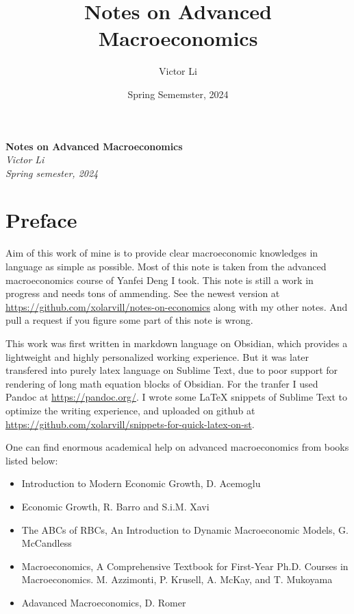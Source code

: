 \documentclass{article}
\title{Notes on Advanced Macroeconomics}
\author{Victor Li}
\date{Spring Sememster, 2024}
\providecommand{\tightlist}{
  \setlength{\itemsep}{0pt}
  \setlength{\parskip}{0pt}}
\begin{document}
\begin{titlepage}
   \begin{center}
      \Large\textbf{Notes on Advanced Macroeconomics}\\
      \large\textit{Victor Li}\\
      \large\textit{Spring semester, 2024}
   \end{center}
\end{titlepage}

\newpage
\tableofcontents

\newpage
{}
\section*{Preface}

Aim of this work of mine is to provide clear macroeconomic knowledges in language as simple as possible. Most of this note is taken from the advanced macroeconomics course of Yanfei Deng I took. This note is still a work in progress and needs tons of ammending. See the newest version at \url{https://github.com/xolarvill/notes-on-economics} along with my other notes. And pull a request if you figure some part of this note is wrong.

This work was first written in markdown language on Obsidian, which provides a lightweight and highly personalized working experience. But it was later transfered into purely latex language on Sublime Text, due to poor support for rendering of long math equation blocks of Obsidian. For the tranfer I used Pandoc at \url{https://pandoc.org/}. I wrote some LaTeX snippets of Sublime Text to optimize the writing experience, and uploaded on github at \url{https://github.com/xolarvill/snippets-for-quick-latex-on-st}.

One can find enormous academical help on advanced macroeconomics from books listed below:
\begin{itemize}
\tightlist
  \item Introduction to Modern Economic Growth, D. Acemoglu
  \item Economic Growth, R. Barro and S.i.M. Xavi
  \item The ABCs of RBCs, An Introduction to Dynamic Macroeconomic Models, G. McCandless
  \item Macroeconomics, A Comprehensive Textbook for First-Year Ph.D. Courses in Macroeconomics. M. Azzimonti, P. Krusell, A. McKay, and T. Mukoyama
  \item Adavanced Macroeconomics, D. Romer
\end{itemize}
\end{document}
